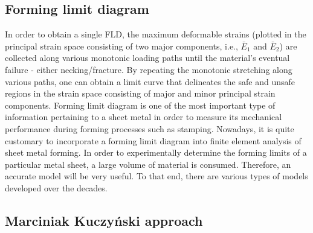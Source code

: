\documentclass[12pt]{amsart}
\begin{document}
\subsection{Forming limit diagram}
\label{sec:fld}
In order to obtain a single FLD, the maximum deformable strains (plotted in the principal strain space consisting of two major components,
i.e., $\bar{E}_1$ and $\bar{E}_2$) are collected along various monotonic loading paths until the material's eventual failure - either necking/fracture.
By repeating the monotonic stretching along various paths, one can obtain a limit curve that delineates the safe and unsafe regions in the strain space consisting of major and minor principal strain components.
Forming limit diagram is one of the most important type of information pertaining to a sheet metal in order to measure its mechanical performance during forming processes such as stamping.
Nowadays, it is quite customary to incorporate a forming limit diagram into finite element analysis of sheet metal forming.
\newline
In order to experimentally determine the forming limits of a particular metal sheet, a large volume of material is consumed.
Therefore, an accurate model will be very useful.
To that end, there are various types of models developed over the decades.

\subsection{Marciniak Kuczy{\'n}ski approach}
\label{sec:mk}
\newcommand*{\Cpsi}{35}%
\newcommand*{\Ctheta}{65}%
\newcommand*{\Cw}{7}%
\newcommand*{\Ch}{7}%
\newcommand*{\CtA}{0.180}%
\newcommand*{\CtB}{0.150}%
\newcommand*{\Cbw}{0.15}%
\newcommand*{\Cdisp}{\Ch/2.}%
\end{document}
